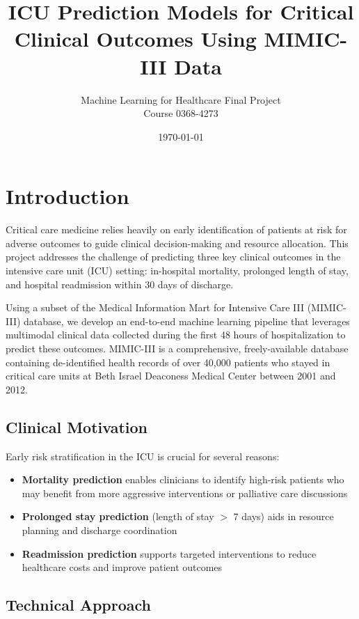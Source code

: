 \documentclass[11pt]{article}
\title{ICU Prediction Models for Critical Clinical Outcomes Using MIMIC-III Data}
\author{Machine Learning for Healthcare Final Project\\
Course 0368-4273}
\date{\today}
\begin{document}
\maketitle

\section{Introduction}

Critical care medicine relies heavily on early identification of patients at risk for adverse outcomes to guide clinical decision-making and resource allocation. This project addresses the challenge of predicting three key clinical outcomes in the intensive care unit (ICU) setting: in-hospital mortality, prolonged length of stay, and hospital readmission within 30 days of discharge.

Using a subset of the Medical Information Mart for Intensive Care III (MIMIC-III) database, we develop an end-to-end machine learning pipeline that leverages multimodal clinical data collected during the first 48 hours of hospitalization to predict these outcomes. MIMIC-III is a comprehensive, freely-available database containing de-identified health records of over 40,000 patients who stayed in critical care units at Beth Israel Deaconess Medical Center between 2001 and 2012.

\subsection{Clinical Motivation}

Early risk stratification in the ICU is crucial for several reasons:
\begin{itemize}
    \item \textbf{Mortality prediction} enables clinicians to identify high-risk patients who may benefit from more aggressive interventions or palliative care discussions
    \item \textbf{Prolonged stay prediction} (length of stay $>$ 7 days) aids in resource planning and discharge coordination
    \item \textbf{Readmission prediction} supports targeted interventions to reduce healthcare costs and improve patient outcomes
\end{itemize}

\subsection{Technical Approach}
\end{document}
